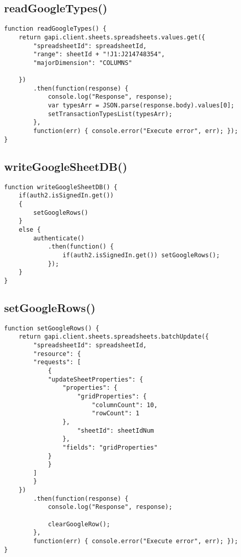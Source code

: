 \documentclass[letterpaper]{article}
\begin{document}
\subsection{readGoogleTypes()}

\begin{lstlisting}[firstnumber=124]
function readGoogleTypes() {
    return gapi.client.sheets.spreadsheets.values.get({
        "spreadsheetId": spreadsheetId,
        "range": sheetId + "!J1:J214748354",
        "majorDimension": "COLUMNS"

    })
        .then(function(response) {
            console.log("Response", response);
            var typesArr = JSON.parse(response.body).values[0];
            setTransactionTypesList(typesArr);
        },
        function(err) { console.error("Execute error", err); });
}
\end{lstlisting}

\subsection{writeGoogleSheetDB()}

\begin{lstlisting}[firstnumber=139]
function writeGoogleSheetDB() {
    if(auth2.isSignedIn.get())
    {
        setGoogleRows()
    }
    else {
        authenticate()
            .then(function() {
                if(auth2.isSignedIn.get()) setGoogleRows();
            });
    }
}
\end{lstlisting}

\subsection{setGoogleRows()}

\begin{lstlisting}[firstnumber=152]
function setGoogleRows() {
    return gapi.client.sheets.spreadsheets.batchUpdate({
        "spreadsheetId": spreadsheetId,
        "resource": {
        "requests": [
            {
            "updateSheetProperties": {
                "properties": {
                    "gridProperties": {
                        "columnCount": 10,
                        "rowCount": 1
                },
                    "sheetId": sheetIdNum
                },
                "fields": "gridProperties"
            }
            }
        ]
        }
    })
        .then(function(response) {
            console.log("Response", response);

            clearGoogleRow();
        },
        function(err) { console.error("Execute error", err); });
}
\end{lstlisting}
\end{document}
